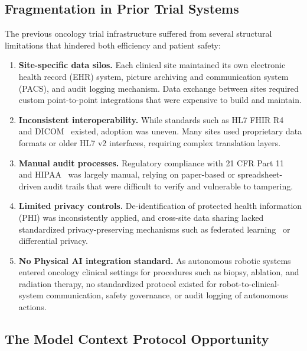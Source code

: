 \documentclass{article}
\begin{document}
\clearpage
\tableofcontents
\clearpage

\subsection{Fragmentation in Prior Trial Systems}

The previous oncology trial infrastructure suffered from several structural limitations that hindered both efficiency and patient safety:

\begin{enumerate}[leftmargin=*]
\item \textbf{Site-specific data silos.} Each clinical site maintained its own electronic health record (EHR) system, picture archiving and communication system (PACS), and audit logging mechanism. Data exchange between sites required custom point-to-point integrations that were expensive to build and maintain.

\item \textbf{Inconsistent interoperability.} While standards such as HL7 FHIR R4~\cite{fhir2019r4} and DICOM~\cite{dicom2024standard} existed, adoption was uneven. Many sites used proprietary data formats or older HL7 v2 interfaces, requiring complex translation layers.

\item \textbf{Manual audit processes.} Regulatory compliance with 21 CFR Part 11~\cite{fda2003part11} and HIPAA~\cite{hipaa1996} was largely manual, relying on paper-based or spreadsheet-driven audit trails that were difficult to verify and vulnerable to tampering.

\item \textbf{Limited privacy controls.} De-identification of protected health information (PHI) was inconsistently applied, and cross-site data sharing lacked standardized privacy-preserving mechanisms such as federated learning~\cite{mcmahan2017fedavg} or differential privacy.

\item \textbf{No Physical AI integration standard.} As autonomous robotic systems entered oncology clinical settings for procedures such as biopsy, ablation, and radiation therapy, no standardized protocol existed for robot-to-clinical-system communication, safety governance, or audit logging of autonomous actions.
\end{enumerate}

\subsection{The Model Context Protocol Opportunity}
\end{document}
